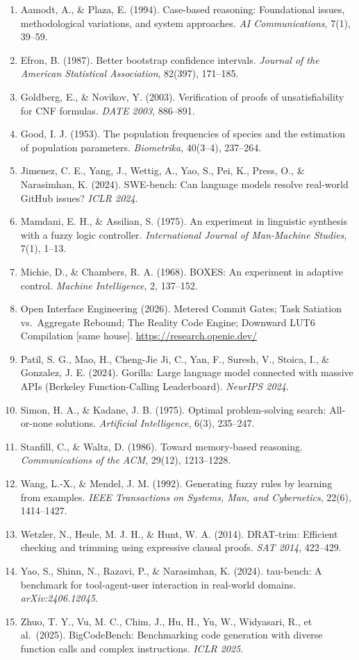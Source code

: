 \documentclass[10pt,letterpaper]{article}
\newcounter{none}
\providecommand{\tightlist}{\setlength{\itemsep}{1pt}\setlength{\parskip}{0pt}}
\begin{document}
\begin{enumerate}
\def\labelenumi{\arabic{enumi}.}
\tightlist
\item
  Aamodt, A., \& Plaza, E. (1994). Case-based reasoning: Foundational
  issues, methodological variations, and system approaches. \emph{AI
  Communications}, 7(1), 39--59.
\item
  Efron, B. (1987). Better bootstrap confidence intervals. \emph{Journal
  of the American Statistical Association}, 82(397), 171--185.
\item
  Goldberg, E., \& Novikov, Y. (2003). Verification of proofs of
  unsatisfiability for CNF formulas. \emph{DATE 2003}, 886--891.
\item
  Good, I. J. (1953). The population frequencies of species and the
  estimation of population parameters. \emph{Biometrika}, 40(3--4),
  237--264.
\item
  Jimenez, C. E., Yang, J., Wettig, A., Yao, S., Pei, K., Press, O., \&
  Narasimhan, K. (2024). SWE-bench: Can language models resolve
  real-world GitHub issues? \emph{ICLR 2024}.
\item
  Mamdani, E. H., \& Assilian, S. (1975). An experiment in linguistic
  synthesis with a fuzzy logic controller. \emph{International Journal
  of Man-Machine Studies}, 7(1), 1--13.
\item
  Michie, D., \& Chambers, R. A. (1968). BOXES: An experiment in
  adaptive control. \emph{Machine Intelligence}, 2, 137--152.
\item
  Open Interface Engineering (2026). Metered Commit Gates; Task
  Satiation vs.~Aggregate Rebound; The Reality Code Engine; Downward
  LUT6 Compilation {[}same house{]}. \url{https://research.openie.dev/}
\item
  Patil, S. G., Mao, H., Cheng-Jie Ji, C., Yan, F., Suresh, V., Stoica,
  I., \& Gonzalez, J. E. (2024). Gorilla: Large language model connected
  with massive APIs (Berkeley Function-Calling Leaderboard).
  \emph{NeurIPS 2024}.
\item
  Simon, H. A., \& Kadane, J. B. (1975). Optimal problem-solving search:
  All-or-none solutions. \emph{Artificial Intelligence}, 6(3), 235--247.
\item
  Stanfill, C., \& Waltz, D. (1986). Toward memory-based reasoning.
  \emph{Communications of the ACM}, 29(12), 1213--1228.
\item
  Wang, L.-X., \& Mendel, J. M. (1992). Generating fuzzy rules by
  learning from examples. \emph{IEEE Transactions on Systems, Man, and
  Cybernetics}, 22(6), 1414--1427.
\item
  Wetzler, N., Heule, M. J. H., \& Hunt, W. A. (2014). DRAT-trim:
  Efficient checking and trimming using expressive clausal proofs.
  \emph{SAT 2014}, 422--429.
\item
  Yao, S., Shinn, N., Razavi, P., \& Narasimhan, K. (2024). tau-bench: A
  benchmark for tool-agent-user interaction in real-world domains.
  \emph{arXiv:2406.12045}.
\item
  Zhuo, T. Y., Vu, M. C., Chim, J., Hu, H., Yu, W., Widyasari, R., et
  al.~(2025). BigCodeBench: Benchmarking code generation with diverse
  function calls and complex instructions. \emph{ICLR 2025}.
\end{enumerate}
\end{document}
